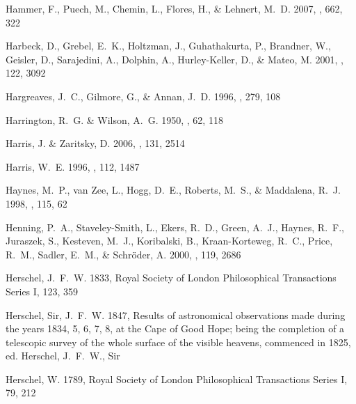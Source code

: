 \documentclass[manuscript]{aastex}
\begin{document}
\begin{thebibliography}{381}
{Hammer}, F., {Puech}, M., {Chemin}, L., {Flores}, H., \& {Lehnert}, M.~D.
  2007, \apj, 662, 322

{Harbeck}, D., {Grebel}, E.~K., {Holtzman}, J., {Guhathakurta}, P., {Brandner},
  W., {Geisler}, D., {Sarajedini}, A., {Dolphin}, A., {Hurley-Keller}, D., \&
  {Mateo}, M. 2001, \aj, 122, 3092

{Hargreaves}, J.~C., {Gilmore}, G., \& {Annan}, J.~D. 1996, \mnras, 279, 108

{Harrington}, R.~G. \& {Wilson}, A.~G. 1950, \pasp, 62, 118

{Harris}, J. \& {Zaritsky}, D. 2006, \aj, 131, 2514

{Harris}, W.~E. 1996, \aj, 112, 1487

{Haynes}, M.~P., {van Zee}, L., {Hogg}, D.~E., {Roberts}, M.~S., \&
  {Maddalena}, R.~J. 1998, \aj, 115, 62

{Henning}, P.~A., {Staveley-Smith}, L., {Ekers}, R.~D., {Green}, A.~J.,
  {Haynes}, R.~F., {Juraszek}, S., {Kesteven}, M.~J., {Koribalski}, B.,
  {Kraan-Korteweg}, R.~C., {Price}, R.~M., {Sadler}, E.~M., \& {Schr{\"o}der},
  A. 2000, \aj, 119, 2686

{Herschel}, J.~F.~W. 1833, Royal Society of London Philosophical Transactions
  Series I, 123, 359

{Herschel}, Sir, J.~F.~W. 1847, {Results of astronomical observations made
  during the years 1834, 5, 6, 7, 8, at the Cape of Good Hope; being the
  completion of a telescopic survey of the whole surface of the visible
  heavens, commenced in 1825}, ed. {Herschel, J.~F.~W., Sir}

{Herschel}, W. 1789, Royal Society of London Philosophical Transactions Series
  I, 79, 212


\end{thebibliography}
\end{document}
